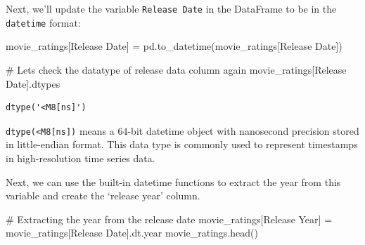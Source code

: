 \documentclass[
  letterpaper,
  DIV=11,
  numbers=noendperiod]{scrreprt}
\newenvironment{Shaded}{\begin{snugshade}}{\end{snugshade}}
\newcommand{\CommentTok}[1]{\textcolor[rgb]{0.37,0.37,0.37}{#1}}
\newcommand{\NormalTok}[1]{\textcolor[rgb]{0.00,0.23,0.31}{#1}}
\newcommand{\OperatorTok}[1]{\textcolor[rgb]{0.37,0.37,0.37}{#1}}
\newcommand{\StringTok}[1]{\textcolor[rgb]{0.13,0.47,0.30}{#1}}
\begin{document}
Next, we'll update the variable \texttt{Release\ Date} in the DataFrame
to be in the \texttt{datetime} format:

\begin{Shaded}
\begin{Highlighting}[]
\NormalTok{movie\_ratings[}\StringTok{\textquotesingle{}Release Date\textquotesingle{}}\NormalTok{] }\OperatorTok{=}\NormalTok{ pd.to\_datetime(movie\_ratings[}\StringTok{\textquotesingle{}Release Date\textquotesingle{}}\NormalTok{])}
\end{Highlighting}
\end{Shaded}

\begin{Shaded}
\begin{Highlighting}[]
\CommentTok{\# Let\textquotesingle{}s check the datatype of release data column again}
\NormalTok{movie\_ratings[}\StringTok{\textquotesingle{}Release Date\textquotesingle{}}\NormalTok{].dtypes}
\end{Highlighting}
\end{Shaded}

\begin{verbatim}
dtype('<M8[ns]')
\end{verbatim}

\texttt{dtype(\textquotesingle{}\textless{}M8{[}ns{]}\textquotesingle{})}
means a 64-bit datetime object with nanosecond precision stored in
little-endian format. This data type is commonly used to represent
timestamps in high-resolution time series data.

Next, we can use the built-in datetime functions to extract the year
from this variable and create the `release year' column.

\begin{Shaded}
\begin{Highlighting}[]
\CommentTok{\# Extracting the year from the release date}
\NormalTok{movie\_ratings[}\StringTok{\textquotesingle{}Release Year\textquotesingle{}}\NormalTok{] }\OperatorTok{=}\NormalTok{ movie\_ratings[}\StringTok{\textquotesingle{}Release Date\textquotesingle{}}\NormalTok{].dt.year}
\NormalTok{movie\_ratings.head()}
\end{Highlighting}
\end{Shaded}
\end{document}
